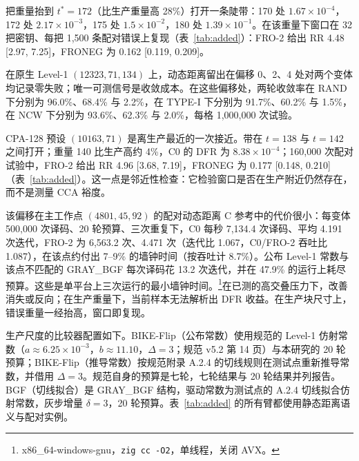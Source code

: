 \documentclass[UTF8,a4paper,10pt,twocolumn]{ctexart}
\begin{document}
把重量抬到 $t^\ast=172$（比生产重量高 28\%）打开一条陡带：170 处 $1.67\times10^{-4}$，172 处 $2.17\times10^{-3}$，175 处 $1.5\times10^{-2}$，180 处 $1.39\times10^{-1}$。在该重量下窗口在 32 把密钥、每把 1{,}500 条配对错误上复现（表~\ref{tab:added}）：FRO-2 给出 RR 4.48 [2.97, 7.25]，FRONEG 为 0.162 [0.119, 0.209]。

在原生 Level-1 $(12323,71,134)$ 上，动态距离留出在偏移 0、2、4 处对两个变体均记录零失败；唯一可测信号是收敛成本。在这些偏移处，两轮收敛率在 RAND 下分别为 96.0\%、68.4\% 与 2.2\%，在 TYPE-I 下分别为 91.7\%、60.2\% 与 1.5\%，在 NCW 下分别为 93.6\%、62.3\% 与 2.0\%，每格 1{,}000{,}000 次试验。

CPA-128 预设 $(10163,71)$ 是离生产最近的一次接近。带在 $t=138$ 与 $t=142$ 之间打开；重量 140 比生产高约 4\%，C0 的 DFR 为 $8.38\times10^{-4}$；160{,}000 次配对试验中，FRO-2 给出 RR 4.96 [3.68, 7.19]，FRONEG 为 0.177 [0.148, 0.210]（表~\ref{tab:added}）。这一点是邻近性检查：它检验窗口是否在生产附近仍然存在，而不是测量 CCA 裕度。

该偏移在主工作点 $(4801,45,92)$ 的配对动态距离 C 参考中的代价很小：每变体 500{,}000 次译码、20 轮预算、三次重复下，C0 每秒 7{,}134.4 次译码、平均 4.191 次迭代，FRO-2 为 6{,}563.2 次、4.471 次（迭代比 1.067，C0/FRO-2 吞吐比 1.087），在该点约付出 7--9\% 的墙钟时间（按吞吐计 8.7\%）。公布 Level-1 常数与该点不匹配的 GRAY\_BGF 每次译码花 13.2 次迭代，并在 47.9\% 的运行上耗尽预算。这些是单平台上三次运行的最小墙钟时间。\footnote{x86\_64-windows-gnu，\texttt{zig cc -O2}，单线程，关闭 AVX。}在已测的高交叠压力下，改善消失或反向；在生产重量下，当前样本无法解析出 DFR 收益。在生产块尺寸上，错误重量一经抬高，窗口即复现。

生产尺度的比较器配置如下。BIKE-Flip（公布常数）使用规范的 Level-1 仿射常数（$a\approx6.25\times10^{-3}$，$b\approx11.10$，$\Delta=3$；规范 v5.2 第 14 页）与本研究的 20 轮预算；BIKE-Flip（推导常数）按规范附录 A.2.4 的切线规则在测试点重新推导常数，并借用 $\Delta=3$。规范自身的预算是七轮，七轮结果与 20 轮结果并列报告。BGF（切线拟合）是 GRAY\_BGF 结构，驱动常数为测试点的 A.2.4 切线拟合仿射常数，灰步增量 $\delta=3$，20 轮预算。表~\ref{tab:added} 的所有臂都使用静态距离语义与配对实例。
\end{document}
